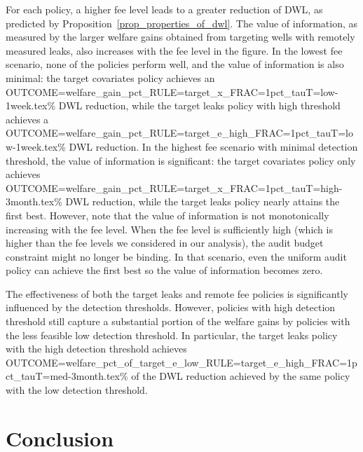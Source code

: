 \documentclass[12pt,oneside,letterpaper]{article}
\theoremstyle{definition}
\begin{document}
\begin{refsection}
For each policy, a higher fee level leads to a greater reduction of \gls{DWL}, as predicted by Proposition~\ref{prop_properties_of_dwl}.
The value of information, as measured by the larger welfare gains obtained from targeting wells with remotely measured leaks, also increases with the fee level in the figure.
In the lowest fee scenario, none of the policies perform well, and the value of information is also minimal: the target covariates policy achieves an
{OUTCOME=welfare_gain_pct_RULE=target_x_FRAC=1pct_tauT=low-1week.tex}\%
\gls{DWL} reduction, while the target leaks policy with high threshold achieves a
{OUTCOME=welfare_gain_pct_RULE=target_e_high_FRAC=1pct_tauT=low-1week.tex}\% \gls{DWL} reduction.
In the highest fee scenario with minimal detection threshold, the value of information is significant: the target covariates policy only achieves
{OUTCOME=welfare_gain_pct_RULE=target_x_FRAC=1pct_tauT=high-3month.tex}\%
\gls{DWL} reduction, while the target leaks policy nearly attains the first best.
However, note that the value of information is not monotonically increasing with the fee level.
When the fee level is sufficiently high (which is higher than the fee levels we considered in our analysis), the audit budget constraint might no longer be binding.
In that scenario, even the uniform audit policy can achieve the first best so the value of information becomes zero.

The effectiveness of both the target leaks and remote fee policies is significantly influenced by the detection thresholds.
However, policies with high detection threshold still capture a substantial portion of the welfare gains by policies with the less feasible low detection threshold.
In particular, the target leaks policy with the high detection threshold achieves
{OUTCOME=welfare_pct_of_target_e_low_RULE=target_e_high_FRAC=1pct_tauT=med-3month.tex}\%
of the \gls{DWL} reduction achieved by the same policy with the low detection threshold.


\section{Conclusion}
\label{sec:conclusion}



\end{refsection}
\end{document}
